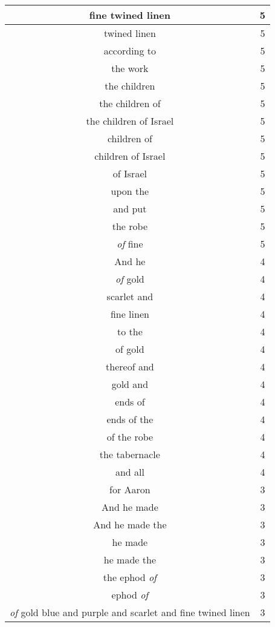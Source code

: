 \begin{center}
\begin{longtable}{|c|c|}
fine twined linen & 5\\ \hline 
twined linen & 5\\ \hline 
according to & 5\\ \hline 
the work & 5\\ \hline 
the children & 5\\ \hline 
the children of & 5\\ \hline 
the children of Israel & 5\\ \hline 
children of & 5\\ \hline 
children of Israel & 5\\ \hline 
of Israel & 5\\ \hline 
upon the & 5\\ \hline 
and put & 5\\ \hline 
the robe & 5\\ \hline 
\emph{of} fine & 5\\ \hline 
And he & 4\\ \hline 
\emph{of} gold & 4\\ \hline 
scarlet and & 4\\ \hline 
fine linen & 4\\ \hline 
to the & 4\\ \hline 
of gold & 4\\ \hline 
thereof and & 4\\ \hline 
gold and & 4\\ \hline 
ends of & 4\\ \hline 
ends of the & 4\\ \hline 
of the robe & 4\\ \hline 
the tabernacle & 4\\ \hline 
and all & 4\\ \hline 
for Aaron & 3\\ \hline 
And he made & 3\\ \hline 
And he made the & 3\\ \hline 
he made & 3\\ \hline 
he made the & 3\\ \hline 
the ephod \emph{of} & 3\\ \hline 
ephod \emph{of} & 3\\ \hline 
\emph{of} gold blue and purple and scarlet and fine twined linen & 3\\ \hline 


\end{longtable}
\end{center}
